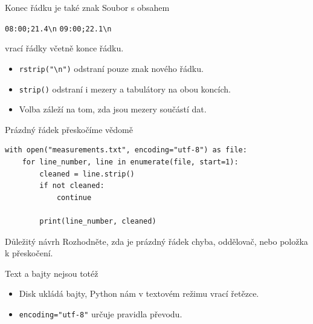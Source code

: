 \documentclass[aspectratio=169]{beamer}
\begin{document}
\begin{frame}{Konec řádku je také znak}
  Soubor s obsahem
  \begin{center}
    \texttt{08:00;21.4}\quad\texttt{\textbackslash n}\quad
    \texttt{09:00;22.1}\quad\texttt{\textbackslash n}
  \end{center}
  vrací řádky včetně konce řádku.
  \begin{itemize}
    \item \texttt{rstrip("\textbackslash n")} odstraní pouze znak nového řádku.
    \item \texttt{strip()} odstraní i mezery a tabulátory na obou koncích.
    \item Volba záleží na tom, zda jsou mezery součástí dat.
  \end{itemize}
\end{frame}

\begin{frame}[fragile]{Prázdný řádek přeskočíme vědomě}
\begin{lstlisting}[style=python]
with open("measurements.txt", encoding="utf-8") as file:
    for line_number, line in enumerate(file, start=1):
        cleaned = line.strip()
        if not cleaned:
            continue

        print(line_number, cleaned)
\end{lstlisting}
  \begin{block}{Důležitý návrh}
    Rozhodněte, zda je prázdný řádek chyba, oddělovač, nebo položka k přeskočení.
  \end{block}
\end{frame}

\begin{frame}{Text a bajty nejsou totéž}
  \centering
  \vspace{5mm}

  \begin{itemize}
    \item Disk ukládá bajty, Python nám v textovém režimu vrací řetězce.
    \item \texttt{encoding="utf-8"} určuje pravidla převodu.
  \end{itemize}
\end{frame}
\end{document}
